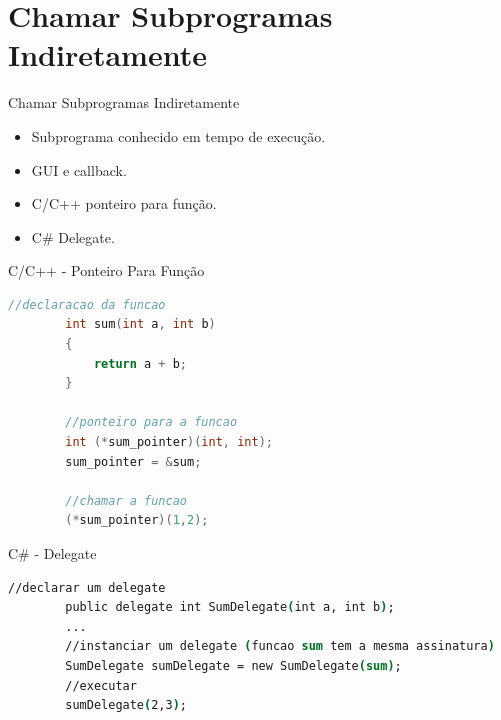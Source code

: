 \section{Chamar Subprogramas Indiretamente}
\begin{frame}{Chamar Subprogramas Indiretamente}
	\begin{itemize}
	  \item Subprograma conhecido em tempo de execução.
	  \item GUI e callback.
	  \item C/C++ ponteiro para função.
	  \item C\# Delegate.
	\end{itemize}
\end{frame}

\begin{frame}[fragile]{C/C++ - Ponteiro Para Função}
	\begin{lstlisting}[language=c]
		//declaracao da funcao
		int sum(int a, int b)
		{
			return a + b;
		}

		//ponteiro para a funcao
		int (*sum_pointer)(int, int);
		sum_pointer = &sum;
		
		//chamar a funcao
		(*sum_pointer)(1,2);
	\end{lstlisting}
\end{frame}

\begin{frame}[fragile]{C\# - Delegate}
	\begin{lstlisting}[language=csh]
		//declarar um delegate
		public delegate int SumDelegate(int a, int b);
		...
		//instanciar um delegate (funcao sum tem a mesma assinatura)
		SumDelegate sumDelegate = new SumDelegate(sum);
		//executar
		sumDelegate(2,3);
	\end{lstlisting}
\end{frame}